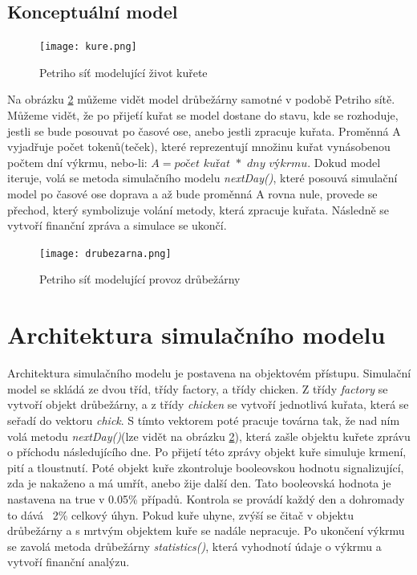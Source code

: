 \documentclass[a4paper,10pt]{article}
\begin{document}
\subsection{Konceptuální model}
\begin{figure}[h]
\caption{Petriho síť modelující život kuřete}
\texttt{[image: kure.png]}
\label{obr:petri_kure}
\end{figure}

Na obrázku \ref{obr:drubezarna} můžeme vidět model drůbežárny samotné v podobě Petriho sítě. Můžeme vidět, že po přijeťí kuřat
se model dostane do stavu, kde se rozhoduje, jestli se bude posouvat po časové ose, anebo jestli zpracuje
kuřata. Proměnná A vyjadřuje počet tokenů(teček), které reprezentují množinu kuřat vynásobenou počtem dní výkrmu,
nebo-li: 
$A=\textit{počet kuřat }*\textit{ dny výkrmu}$.
Dokud model iteruje, volá se metoda simulačního modelu \textit{nextDay()}, které posouvá simulační model po časové ose doprava
a až bude proměnná A rovna nule, provede se přechod, který symbolizuje volání metody, která zpracuje kuřata. Následně 
se vytvoří finanční zpráva a simulace se ukončí.


\begin{figure}[h]
\caption{Petriho síť modelující provoz drůbežárny}
\texttt{[image: drubezarna.png]}
\label{obr:drubezarna}
\end{figure}

\pagebreak

\section{Architektura simulačního modelu}\label{architektura}
Architektura simulačního modelu je postavena na objektovém přístupu. Simulační model se skládá ze dvou tříd,
třídy factory, a třídy chicken. Z třídy \textit{factory} se vytvoří objekt drůbežárny, a z třídy \textit{chicken}
se vytvoří jednotlivá kuřata, která se seřadí do vektoru \textit{chick}. S tímto vektorem poté pracuje továrna tak,
že nad ním volá metodu \textit{nextDay()}(lze vidět na obrázku \ref{obr:drubezarna}), která zašle objektu kuřete
zprávu o příchodu následujícího dne. Po přijetí této zprávy objekt kuře simuluje krmení, pití a tloustnutí.
Poté objekt kuře zkontroluje booleovskou hodnotu signalizující, zda je nakaženo a má umřít, anebo žije další den.
Tato booleovská hodnota je nastavena na true v 0.05\% případů. Kontrola se provádí každý den a dohromady to dává ~2\% celkový úhyn.
Pokud kuře uhyne, zvýší se čitač v objektu drůbežárny a s mrtvým objektem kuře se nadále nepracuje.
Po ukončení výkrmu se zavolá metoda drůbežárny \textit{statistics()}, která vyhodnotí údaje o výkrmu a vytvoří finanční analýzu.
\end{document}

